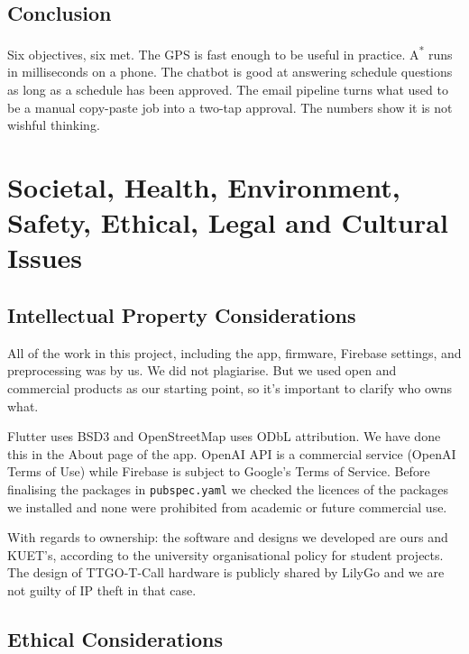 \documentclass[12pt,a4paper]{report}
\begin{document}
\section{Conclusion}

Six objectives, six met. The GPS is fast enough to be useful in practice. A\textsuperscript{*} runs in milliseconds on a phone. The chatbot is good at answering schedule questions as long as a schedule has been approved. The email pipeline turns what used to be a manual copy-paste job into a two-tap approval. The numbers show it is not wishful thinking.

\chapter{Societal, Health, Environment, Safety, Ethical, Legal and Cultural Issues}

\section{Intellectual Property Considerations}

All of the work in this project, including the app, firmware, Firebase settings, and preprocessing was by us. We did not plagiarise. But we used open and commercial products as our starting point, so it's important to clarify who owns what.

Flutter uses BSD3 and OpenStreetMap uses ODbL attribution. We have done this in the About page of the app. OpenAI API is a commercial service (OpenAI Terms of Use) while Firebase is subject to Google's Terms of Service. Before finalising the packages in \texttt{pubspec.yaml} we checked the licences of the packages we installed and none were prohibited from academic or future commercial use.

With regards to ownership: the software and designs we developed are ours and KUET's, according to the university organisational policy for student projects. The design of TTGO-T-Call hardware is publicly shared by LilyGo and we are not guilty of IP theft in that case.

\section{Ethical Considerations}
\end{document}

